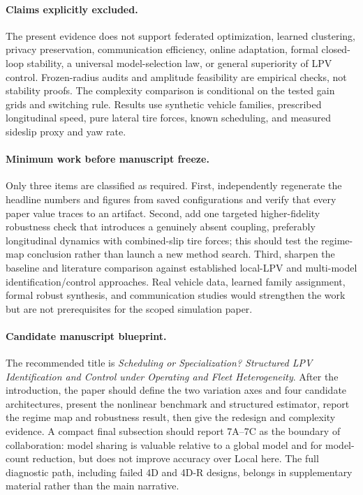 \paragraph{Claims explicitly excluded.}
The present evidence does not support federated optimization, learned clustering,
privacy preservation, communication efficiency, online adaptation, formal
closed-loop stability, a universal model-selection law, or general superiority
of LPV control. Frozen-radius audits and amplitude feasibility are empirical
checks, not stability proofs. The complexity comparison is conditional on the
tested gain grids and switching rule. Results use synthetic vehicle families,
prescribed longitudinal speed, pure lateral tire forces, known scheduling, and
measured sideslip proxy and yaw rate.

\paragraph{Minimum work before manuscript freeze.}
Only three items are classified as required. First, independently regenerate
the headline numbers and figures from saved configurations and verify that every
paper value traces to an artifact. Second, add one targeted higher-fidelity
robustness check that introduces a genuinely absent coupling, preferably
longitudinal dynamics with combined-slip tire forces; this should test the
regime-map conclusion rather than launch a new method search. Third, sharpen the
baseline and literature comparison against established local-LPV and multi-model
identification/control approaches. Real vehicle data, learned family assignment,
formal robust synthesis, and communication studies would strengthen the work but
are not prerequisites for the scoped simulation paper.

\paragraph{Candidate manuscript blueprint.}
The recommended title is \emph{Scheduling or Specialization? Structured LPV
Identification and Control under Operating and Fleet Heterogeneity}. After the
introduction, the paper should define the two variation axes and four candidate
architectures, present the nonlinear benchmark and structured estimator, report
the regime map and robustness result, then give the redesign and complexity
evidence. A compact final subsection should report 7A--7C as the boundary of
collaboration: model sharing is valuable relative to a global model and for
model-count reduction, but does not improve accuracy over Local here. The full
diagnostic path, including failed 4D and 4D-R designs, belongs in supplementary
material rather than the main narrative.

